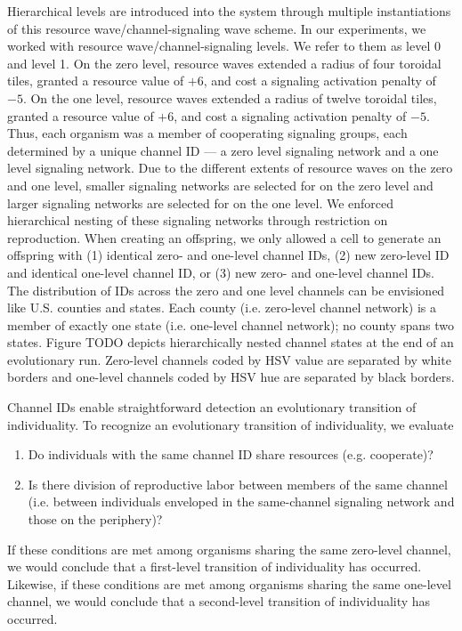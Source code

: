 Hierarchical levels are introduced into the system through multiple instantiations of this resource wave/channel-signaling wave scheme.
In our experiments, we worked with resource wave/channel-signaling levels.
We refer to them as level 0 and level 1.
On the zero level, resource waves extended a radius of four toroidal tiles, granted a resource value of $+6$, and cost a signaling activation penalty of $-5$.
On the one level, resource waves extended a radius of twelve toroidal tiles, granted a resource value of $+6$, and cost a signaling activation penalty of $-5$.
Thus, each organism was a member of cooperating signaling groups, each determined by a unique channel ID --- a zero level signaling network and a one level signaling network.
Due to the different extents of resource waves on the zero and one level, smaller signaling networks are selected for on the zero level and larger signaling networks are selected for on the one level.
We enforced hierarchical nesting of these signaling networks through restriction on reproduction.
When creating an offspring, we only allowed a cell to generate an offspring with (1) identical zero- and one-level channel IDs, (2) new zero-level ID and identical one-level channel ID, or (3) new zero- and one-level channel IDs.
The distribution of IDs across the zero and one level channels can be envisioned like U.S. counties and states.
Each county (i.e. zero-level channel network) is a member of exactly one state (i.e. one-level channel network);
no county spans two states.
Figure TODO depicts hierarchically nested channel states at the end of an evolutionary run.
Zero-level channels coded by HSV value are separated by white borders and one-level channels coded by HSV hue are separated by black borders.

Channel IDs enable straightforward detection an evolutionary transition of individuality.
To recognize an evolutionary transition of individuality, we evaluate
\begin{enumerate}
\item Do individuals with the same channel ID share resources (e.g. cooperate)?
\item Is there division of reproductive labor between members of the same channel (i.e. between individuals enveloped in the same-channel signaling network and those on the periphery)?
\end{enumerate}

If these conditions are met among organisms sharing the same zero-level channel, we would conclude that a first-level transition of individuality has occurred.
Likewise, if these conditions are met among organisms sharing the same one-level channel, we would conclude that a second-level transition of individuality has occurred.

